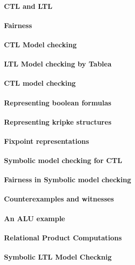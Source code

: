 \paragraph{CTL and LTL}
\paragraph{Fairness}
\paragraph{CTL Model checking}
\paragraph{LTL Model checking by Tablea}
\paragraph{CTL model checking}
\paragraph{Representing boolean formulas}
\paragraph{Representing kripke structures}
\paragraph{Fixpoint representations}
\paragraph{Symbolic model checking for CTL}
\paragraph{Fairness in Symbolic model checking}
\paragraph{Counterexamples and witnesses}
\paragraph{An ALU example}
\paragraph{Relational Product Computations}
\paragraph{Symbolic LTL Model Checknig}
